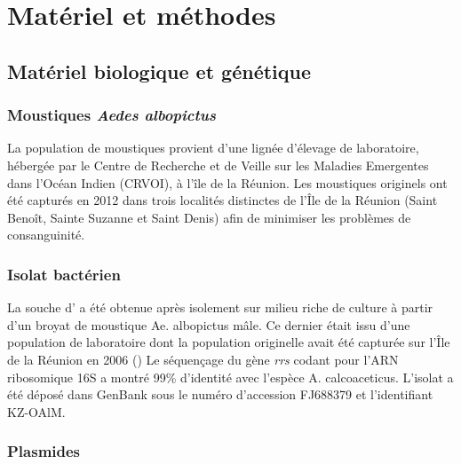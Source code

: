 \chapter{Matériel et méthodes}

\section{Matériel biologique et génétique}

\subsection{Moustiques \textit{Aedes albopictus}}
\label{par:moustiques}
La population de moustiques  provient d'une lignée d'élevage de laboratoire, hébergée par le Centre de Recherche et de Veille sur les Maladies Emergentes dans l'Océan Indien (CRVOI), à l’île de la Réunion.
Les moustiques originels ont été capturés en 2012 dans trois localités distinctes de l’Île de la Réunion (Saint Benoît, Sainte Suzanne et Saint Denis) afin de minimiser les problèmes de consanguinité.

\subsection{Isolat bactérien}
La souche d' a été obtenue après isolement sur milieu riche de culture à partir d’un broyat de moustique Ae. albopictus mâle. Ce dernier était issu d’une population de laboratoire dont la population originelle avait été capturée sur l’Île de la Réunion en 2006 (\textcite{zouache2009})
Le séquençage du gène \textit{rrs} codant pour l'ARN ribosomique 16S a montré 99\% d’identité avec l’espèce A. calcoaceticus. L’isolat a été déposé dans GenBank sous le numéro d’accession FJ688379 et l’identifiant KZ-OAlM.

\subsection{Plasmides}


